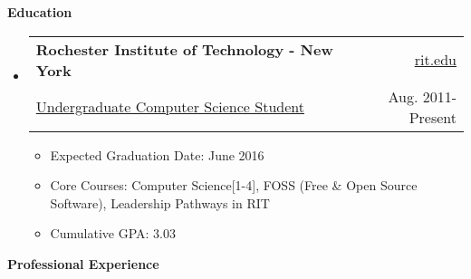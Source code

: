 \documentclass[letterpaper,11pt]{article}
\makeatletter
\newcommand{\resheading}[1]{{\large \colorbox{mygrey}{\begin{minipage}{\textwidth}{\textbf{#1 \vphantom{p\^{E}}}}\end{minipage}}}}
\newcommand{\ressubheading}[4]{
\begin{tabular*}{6.5in}{l@{\extracolsep{\fill}}r}
		\textbf{#1} & #2 \\
		{#3} & {#4} \\
\end{tabular*}\vspace{-6pt}}
\makeatother
\begin{document}
\resheading{Education}
	{ \footnotesize
	\begin{itemize}
		\item
			\ressubheading{Rochester Institute of Technology - New York}{\href{http://www.rit.edu}{rit.edu}}{\href{http://www.cs.rit.edu/}{Undergraduate Computer Science Student}}{Aug. 2011-Present}
				{ \footnotesize
				\begin{itemize}
					\item{Expected Graduation Date: June 2016}
					\item{Core Courses: Computer Science[1-4], FOSS (Free \& Open Source Software), Leadership Pathways in RIT}
					\item{Cumulative GPA: 3.03}
				\end{itemize}
				}
	\end{itemize} %
	}
\resheading{Professional Experience}
\end{document}
